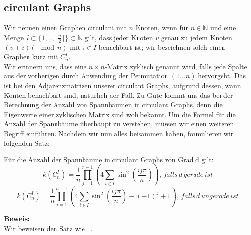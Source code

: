 \graphicspath{{grafiken/}}

\subsection{circulant Graphs}
Wir nennen einen Graphen circulant mit $n$ Knoten, wenn für $n \in \mathbb{N}$ und eine Menge $I \subset{\{1,..,\lfloor \frac{n}{2} \rfloor \}}\subset{\mathbb{N}}$ gilt, dass jeder Knoten $v$ genau zu jedem Knoten $(v+i) (\mod{n})$ mit $i \in I$ benachbart ist; wir bezeichnen solch einen Graphen kurz mit $C_n^I$.\\
Wir erinnern uns, dass eine $n\times n$-Matrix zyklisch genannt wird, falls jede Spalte aus der vorherigen durch Anwendung der Permutation $(1...n)$ hervorgeht.
Das ist bei den Adjazenzmatrizen unserer circulant Graphs, aufgrund dessen, wann Konten benachbart sind, natürlich der Fall.
Zu Gute kommt uns das bei der Berechnung der Anzahl von Spannbäumen in circulant Graphs, denn die Eigenwerte einer zyklischen Matrix sind wohlbekannt.%
Um die Formel für die Anzahl der Spannbäume überhaupt zu verstehen, müssen wir einen weiteren Begriff einführen.%
Nachdem wir nun alles beisammen haben, formulieren wir folgenden Satz:

\begin{Tms}
Für die Anzahl der Spannbäume in circulant Graphs von Grad d gilt:\\
\begin{equation}
\mathit{k}\left( C_n^I \right) = \frac{1}{n} \prod_{j=1}^{n-1} \left(4 \sum_{i \in I} \sin^2 \left( \frac{ij\pi}{n}\right) \right),\,falls\,d\,gerade\,ist
\end{equation}
\begin{equation}
\mathit{k}\left( C_n^I \right) = \frac{1}{n} \prod_{j=1}^{n-1} \left(4 \sum_{i \in I} \sin^2 \left( \frac{ij\pi}{n}\right)-(-1)^j+1\right),\,falls\,d\,ungerade\,ist
\end{equation}
\end{Tms}

\textbf{Beweis:}\\
Wir beweisen den Satz wie ~\cite{wang_yang_1984}.\\

\begin{Bsps}
\end{Bsps} 

